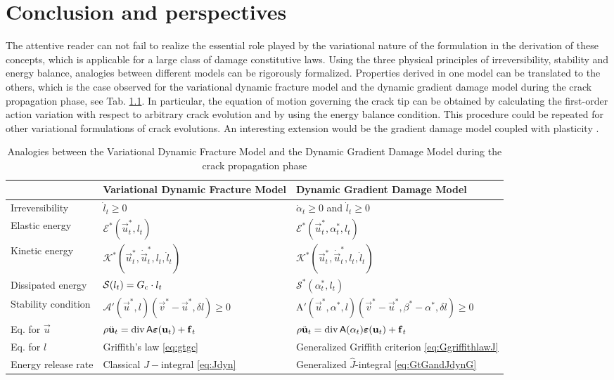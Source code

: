 \chapter{Conclusion and perspectives}

The attentive reader can not fail to realize the essential role played by the variational nature of the formulation in the derivation of these concepts, which is applicable for a large class of damage constitutive laws. Using the three physical principles of irreversibility, stability and energy balance, analogies between different models can be rigorously formalized. Properties derived in one model can be translated to the others, which is the case observed for the variational dynamic fracture model and the dynamic gradient damage model during the crack propagation phase, see Tab. \ref{tab:analogy}. In particular, the equation of motion governing the crack tip can be obtained by calculating the first-order action variation with respect to arbitrary crack evolution and by using the energy balance condition. This procedure could be repeated for other variational formulations of crack evolutions. An interesting extension would be the gradient damage model coupled with plasticity \cite{AlessiMarigoVidoli:2015}.
\begin{table}[htbp]
\caption{Analogies between the Variational Dynamic Fracture Model and the Dynamic Gradient Damage Model during the crack propagation phase} \label{tab:analogy}
\centering
\begin{tabular}{lll} \toprule
 & Variational Dynamic Fracture Model & Dynamic Gradient Damage Model \\ \midrule
Irreversibility & $\dot{l}_t\geq 0$ & $\dot{\alpha}_t\geq 0$ and $\dot{l}_t\geq 0$ \\
Elastic energy & $\mathcal{E}^*(\vec{u}^*_t,l_t)$ & $\mathcal{E}^*(\vec{u}^*_t,\alpha^*_t,l_t)$ \\
Kinetic energy & $\mathcal{K}^*(\vec{u}_t^*,\dot{\vec{u}}_t^*,l_t,\dot{l}_t)$ & $\mathcal{K}^*(\vec{u}_t^*,\dot{\vec{u}}_t^*,l_t,\dot{l}_t)$ \\
Dissipated energy & $\mathcal{S}(l_t)=G_\mathrm{c}\cdot l_t$ & $\mathcal{S}^*(\alpha^*_t,l_t)$ \\
Stability condition & $\mathcal{A}'(\vec{u}^*,l)(\vec{v}^*-\vec{u}^*,\delta l)\geq 0$ & $\mathrm{A}'(\vec{u}^*,\alpha^*,l)(\vec{v}^*-\vec{u}^*,\beta^*-\alpha^*,\delta l)\geq 0$ \\
Eq. for $\vec{u}$ & $\rho\ddot{\vec{u}}_t=\div\tens{A}\eps(\vec{u}_t)+\vec{f}_t$ & $\rho\ddot{\vec{u}}_t=\div\tens{A}(\alpha_t)\eps(\vec{u}_t)+\vec{f}_t$ \\
Eq. for $l$ & Griffith's law \eqref{eq:gtgc} & Generalized Griffith criterion \eqref{eq:GgriffithlawJ} \\
Energy release rate & Classical $J-$integral \eqref{eq:Jdyn} & Generalized $\widehat{J}$-integral \eqref{eq:GtGandJdynG} \\ \bottomrule
\end{tabular}
\end{table}


